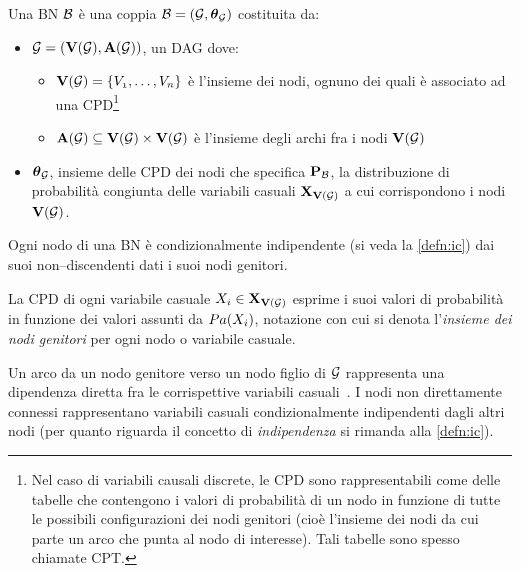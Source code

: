 \begin{definizione}
\label{defn:bn}
Una \acl{BN} $\mathcal{B}$ è una coppia $\mathcal{B}=(\mathcal{G},\boldsymbol{\textbf{\text{$\theta$}}}_{\mathcal{G}})$ costituita da:
\begin{itemize}
    \item $\mathcal{G}=(\mathbf{V}(\mathcal{G}),\mathbf{A}(\mathcal{G}))$, un \acl{DAG} dove:
    \begin{itemize}
        \item $\mathbf{V}(\mathcal{G})=\{\mathnormal{V_1}, \dotsc, \mathnormal{V_n}\}$ è l'insieme dei nodi, ognuno dei quali è associato ad una \acf{CPD}\footnote{Nel caso di variabili causali discrete, le \acs{CPD} sono rappresentabili come delle tabelle che contengono i valori di probabilità di un nodo in funzione di tutte le possibili configurazioni dei nodi genitori (cioè l'insieme dei nodi da cui parte un arco che punta al nodo di interesse). Tali tabelle sono spesso chiamate \acf{CPT}.}
        \item $\mathbf{A}(\mathcal{G})\subseteq\mathbf{V}(\mathcal{G})\times\mathbf{V}(\mathcal{G})$ è l'insieme degli archi fra i nodi $\mathbf{V}(\mathcal{G})$
    \end{itemize}
    \item $\boldsymbol{\textbf{\text{$\theta$}}}_{\mathcal{G}}$, insieme delle \acs{CPD} dei nodi che specifica $\mathbf{P}_{\mathcal{B}}$, la distribuzione di probabilità congiunta delle variabili casuali $\mathbf{X}_{\mathbf{V}(\mathcal{G})}$ a cui corrispondono i nodi $\mathbf{V}(\mathcal{G})$.
\end{itemize}
\end{definizione}
\begin{osservazione}\label{oss:bn-markov-assumption}
Ogni nodo di una \acs{BN} è condizionalmente indipendente (si veda la \autoref{defn:ic}) dai suoi non--discendenti dati i suoi nodi genitori.
\end{osservazione}

La \acs{CPD} di ogni variabile casuale $\mathnormal{X_i}\in\mathbf{X}_{\mathbf{V}(\mathcal{G})}$ esprime i suoi valori di probabilità in funzione dei valori assunti da $Pa(\mathnormal{X_i})$, notazione con cui si denota l'\emph{insieme dei nodi genitori} per ogni nodo o variabile casuale.

Un arco da un nodo genitore verso un nodo figlio di $\mathcal{G}$ rappresenta una dipendenza diretta fra le corrispettive variabili casuali~\citep[si veda][sezione 14.1]{Russel2003}. I nodi non direttamente connessi rappresentano variabili casuali condizionalmente indipendenti dagli altri nodi (per quanto riguarda il concetto di \emph{indipendenza \cond*{}} si rimanda alla \autoref{defn:ic}).

